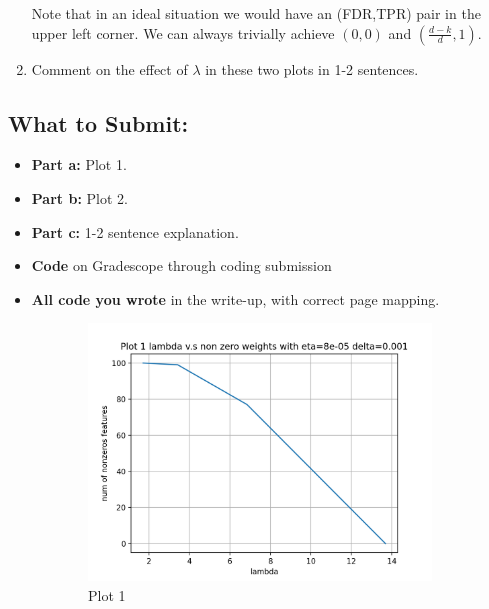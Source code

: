 \documentclass{article}
\begin{document}
\begin{sloppypar}
\begin{aprob}
\begin{enumerate}
        Note that in an ideal situation we would have an (FDR,TPR) pair in the upper left corner. We can always trivially achieve $(0,0)$ and $(\tfrac{d-k}{d},1)$.
          
        \item {} Comment on the effect of $\lambda$ in these two plots in 1-2 sentences.
  \end{enumerate}
  
  \subsection*{What to Submit:}
    \begin{itemize}
        \item \textbf{Part a:} Plot 1.
        \item \textbf{Part b:} Plot 2.
        \item \textbf{Part c:} 1-2 sentence explanation.
        \item \textbf{Code} on Gradescope through coding submission
        \item \textbf{All code you wrote} in the write-up, with correct page mapping.
    \end{itemize}
    \begin{figure}[!h]
        \begin{subfigure}{.45\textwidth}
            \centering
            \includegraphics[width=.9\linewidth]{./img/plot1.png}
            \caption{Plot 1}
            \label{fig:plot1}
        \end{subfigure}
        \begin{subfigure}{.45\textwidth}
            \centering

\end{subfigure}
\end{figure}
\end{aprob}
\end{sloppypar}
\end{document}
